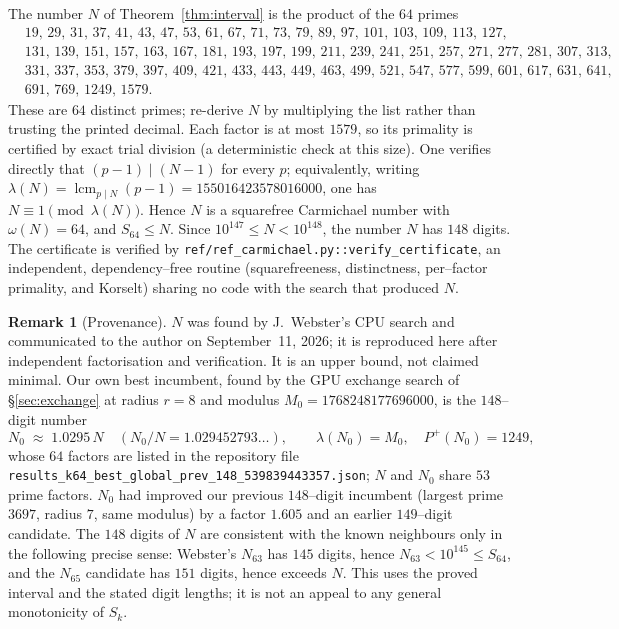 \documentclass[11pt]{article}
\theoremstyle{definition}
\newtheorem{remark}{Remark}
\newcommand{\Smin}{S_{64}}
\newcommand{\Pp}{P^{+}}
\newcommand{\code}[1]{\texttt{#1}}
\begin{document}
The number $N$ of Theorem~\ref{thm:interval} is the product of the $64$ primes
\[
\begin{aligned}
&19,\,29,\,31,\,37,\,41,\,43,\,47,\,53,\,61,\,67,\,71,\,73,\,79,\,89,\,97,\,101,\,103,\,109,\,113,\,127,\\
&131,\,139,\,151,\,157,\,163,\,167,\,181,\,193,\,197,\,199,\,211,\,239,\,241,\,251,\,257,\,271,\,277,\,281,\,307,\,313,\\
&331,\,337,\,353,\,379,\,397,\,409,\,421,\,433,\,443,\,449,\,463,\,499,\,521,\,547,\,577,\,599,\,601,\,617,\,631,\,641,\\
&691,\,769,\,1249,\,1579.
\end{aligned}
\]
These are $64$ distinct primes; re-derive $N$ by multiplying the list rather than trusting the
printed decimal. Each factor is at most $1579$, so its primality is certified by exact trial
division (a deterministic check at this size). One verifies directly that $(p-1)\mid(N-1)$ for every
$p$; equivalently, writing $\lambda(N)=\operatorname{lcm}_{p\mid N}(p-1)=155016423578016000$, one has
$N\equiv 1\pmod{\lambda(N)}$. Hence $N$ is a squarefree Carmichael number with $\omega(N)=64$, and
$\Smin\le N$. Since $10^{147}\le N<10^{148}$, the number $N$ has $148$ digits. The certificate is
verified by \code{ref/ref\_carmichael.py::verify\_certificate}, an independent, dependency--free
routine (squarefreeness, distinctness, per--factor primality, and Korselt) sharing no code with the
search that produced $N$.

\begin{remark}[Provenance]\label{rem:prov}
$N$ was found by J.~Webster's CPU search and communicated to the author on September~11, 2026; it is
reproduced here after independent factorisation and verification. It is an upper bound, not claimed
minimal. Our own best incumbent, found by the GPU exchange search of \S\ref{sec:exchange} at radius
$r=8$ and modulus $M_0=1768248177696000$, is the $148$--digit number
\[
  N_0 \;\approx\; 1.0295\,N \quad (N_0/N=1.029452793\ldots),\qquad \lambda(N_0)=M_0,\quad \Pp(N_0)=1249,
\]
whose $64$ factors are listed in the repository file\\
\code{results\_k64\_best\_global\_prev\_148\_539839443357.json};
$N$ and $N_0$ share $53$ prime factors. $N_0$ had improved our previous $148$--digit incumbent
(largest prime $3697$, radius $7$, same modulus) by a factor $1.605$ and an earlier $149$--digit
candidate. The $148$ digits of $N$ are consistent with the known neighbours only in the following
precise sense: Webster's $N_{63}$ has $145$ digits, hence $N_{63}<10^{145}\le\Smin$, and the $N_{65}$
candidate has $151$ digits, hence exceeds $N$. This uses the proved interval and the stated digit
lengths; it is not an appeal to any general monotonicity of $S_k$.
\end{remark}
\end{document}
